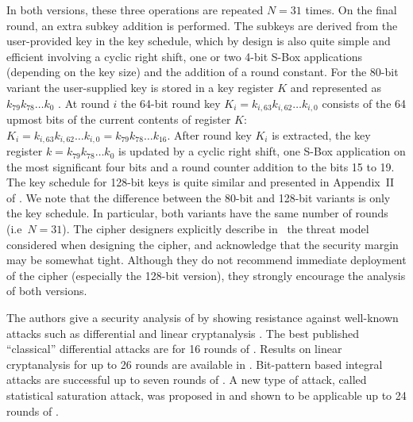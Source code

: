 In both versions, these three operations are repeated $N=31$ times. On the final round, an extra subkey addition is performed. The subkeys are derived from the user-provided key in the key schedule, which by design is also quite simple and efficient involving a cyclic right shift, one or two 4-bit S-Box applications (depending on the key size) and the addition of a round constant. For the 80-bit variant the user-supplied key is stored in a key register $K$ and represented as $k_{79} k_{78} \dots k_0$ . At round $i$ the 64-bit round key $K_i = k_{i,63} k_{i,62} \dots k_{i,0}$ consists of the 64 upmost bits of the current contents of register $K$: $K_i = k_{i,63} k_{i,62} \dots k_{i,0} = k_{79} k_{78} \dots k_{16}.$ After round key $K_i$ is extracted, the key register $k = k_{79} k_{78} \dots k_0$ is updated by a cyclic right shift, one S-Box application on the most significant four bits and a round counter addition to the bits 15 to 19. The key schedule for 128-bit keys is quite similar and presented in Appendix~II of \cite{present}. We note that the difference between the 80-bit and 128-bit variants is only the key schedule. In particular, both variants have the same number of rounds (i.e~$N=31$). The cipher designers explicitly describe in~\cite{present} the threat model considered when designing the cipher, and acknowledge that the security margin may be somewhat tight. Although they do not recommend immediate deployment of the cipher (especially the 128-bit version), they strongly encourage the analysis of both versions.

The \PRESENT authors give a security analysis of \PRESENT by showing resistance against well-known attacks such as differential and linear cryptanalysis \cite{present}. The best published ``classical'' differential attacks are for 16 rounds of  \cite{present-dc:africacrypt}. Results on linear cryptanalysis for up to 26 rounds are available in \cite{present-lc:eprint,present-lh}. Bit-pattern based integral attacks \cite{bit-pattern-ia} are successful up to seven rounds of \PRESENT. A new type of attack, called statistical saturation attack, was proposed in \cite{present-stat-sat} and shown to be applicable up to 24 rounds of \PRESENT.

